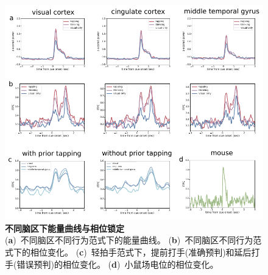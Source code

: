 \begin{figure}[h]
    \centering
    \includegraphics[width=\textwidth]{src/figures/ephys_network.pdf}
    \caption{\textbf{不同脑区下能量曲线与相位锁定}\\
    (\textbf{a})~不同脑区不同行为范式下的能量曲线。
    (\textbf{b})~不同脑区不同行为范式下的相位变化。
    (\textbf{c})~轻拍手范式下，提前打手(准确预判)和延后打手(错误预判)的相位变化。
    (\textbf{d})~小鼠场电位的相位变化。}
    \label{fig:ephys_network}
\end{figure}

